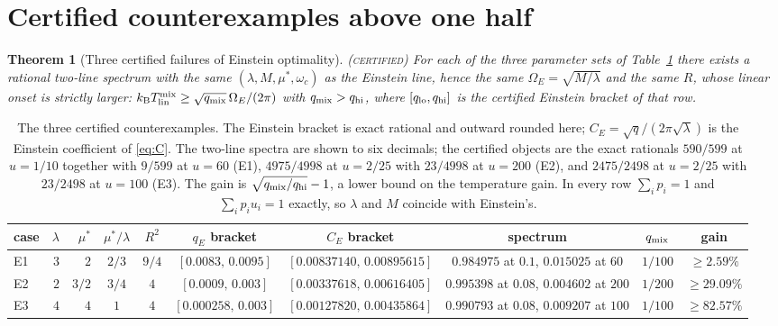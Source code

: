 \documentclass[11pt]{article}
\newcommand{\kb}{k_{\mathrm B}}
\newcommand{\Tlin}{T_{\mathrm{lin}}}
\newcommand{\OmE}{\Omega_E}
\newcommand{\CE}{C_E}
\newcommand{\muS}{\mu^{*}}
\newtheorem{theorem}{Theorem}[section]
\theoremstyle{definition}
\theoremstyle{remark}
\newcommand{\certified}{\textnormal{\textsc{(certified)}}}
\begin{document}
\section{Certified counterexamples above one half}\label{sec:cert}

\begin{theorem}[Three certified failures of Einstein optimality]\label{thm:cert}\certified
For each of the three parameter sets of Table~\ref{tab:cex} there exists a rational
two-line spectrum with the same $(\lambda,M,\muS,\omega_c)$ as the Einstein line, hence
the same $\OmE=\sqrt{M/\lambda}$ and the same $R$, whose linear onset is strictly larger:
$\kb\Tlin^{\rm mix}\ge\sqrt{q_{\rm mix}}\,\OmE/(2\pi)$ with $q_{\rm mix}>q_{\rm hi}$, where
$[q_{\rm lo},q_{\rm hi}]$ is the certified Einstein bracket of that row.
\end{theorem}

\begin{table}[t]
\centering
\scriptsize
\setlength{\tabcolsep}{3pt}
\renewcommand{\arraystretch}{1.15}
\begin{tabular}{@{}lrrccccccc@{}}
\toprule
case & $\lambda$ & $\muS$ & $\muS/\lambda$ & $R^2$ & $q_E$ bracket & $\CE$ bracket &
spectrum & $q_{\rm mix}$ & gain\\
\midrule
E1 & $3$ & $2$ & $2/3$ & $9/4$ & $[0.0083,\,0.0095]$ & $[0.00837140,\,0.00895615]$ &
$0.984975$ at $0.1$, $0.015025$ at $60$ & $1/100$ & $\ge2.59\%$\\
E2 & $2$ & $3/2$ & $3/4$ & $4$ & $[0.0009,\,0.003]$ & $[0.00337618,\,0.00616405]$ &
$0.995398$ at $0.08$, $0.004602$ at $200$ & $1/200$ & $\ge29.09\%$\\
E3 & $4$ & $4$ & $1$ & $4$ & $[0.000258,\,0.003]$ & $[0.00127820,\,0.00435864]$ &
$0.990793$ at $0.08$, $0.009207$ at $100$ & $1/100$ & $\ge82.57\%$\\
\bottomrule
\end{tabular}
\caption{The three certified counterexamples. The Einstein bracket is exact rational and
outward rounded here; $C_E=\sqrt{q}/(2\pi\sqrt\lambda)$ is the Einstein coefficient of
\eqref{eq:C}. The two-line spectra are shown to six decimals; the certified objects are
the exact rationals $590/599$ at $u=1/10$ together with $9/599$ at $u=60$ (E1),
$4975/4998$ at $u=2/25$ with $23/4998$ at $u=200$ (E2), and $2475/2498$ at $u=2/25$ with
$23/2498$ at $u=100$ (E3). The gain is
$\sqrt{q_{\rm mix}/q_{\rm hi}}-1$, a lower bound on the temperature gain. In every row
$\sum_ip_i=1$ and $\sum_ip_iu_i=1$ exactly, so $\lambda$ and $M$ coincide with
Einstein's.}
\label{tab:cex}
\end{table}
\end{document}
